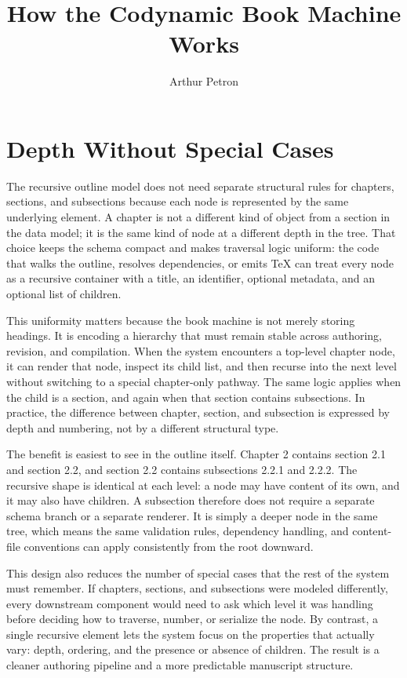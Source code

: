 \documentclass[11pt]{article}
\title{How the Codynamic Book Machine Works}
\author{Arthur Petron}
\begin{document}
\section*{Depth Without Special Cases}

The recursive outline model does not need separate structural rules for chapters, sections, and subsections because each node is represented by the same underlying element. A chapter is not a different kind of object from a section in the data model; it is the same kind of node at a different depth in the tree. That choice keeps the schema compact and makes traversal logic uniform: the code that walks the outline, resolves dependencies, or emits TeX can treat every node as a recursive container with a title, an identifier, optional metadata, and an optional list of children.

This uniformity matters because the book machine is not merely storing headings. It is encoding a hierarchy that must remain stable across authoring, revision, and compilation. When the system encounters a top-level chapter node, it can render that node, inspect its child list, and then recurse into the next level without switching to a special chapter-only pathway. The same logic applies when the child is a section, and again when that section contains subsections. In practice, the difference between chapter, section, and subsection is expressed by depth and numbering, not by a different structural type.

The benefit is easiest to see in the outline itself. Chapter 2 contains section 2.1 and section 2.2, and section 2.2 contains subsections 2.2.1 and 2.2.2. The recursive shape is identical at each level: a node may have content of its own, and it may also have children. A subsection therefore does not require a separate schema branch or a separate renderer. It is simply a deeper node in the same tree, which means the same validation rules, dependency handling, and content-file conventions can apply consistently from the root downward.

This design also reduces the number of special cases that the rest of the system must remember. If chapters, sections, and subsections were modeled differently, every downstream component would need to ask which level it was handling before deciding how to traverse, number, or serialize the node. By contrast, a single recursive element lets the system focus on the properties that actually vary: depth, ordering, and the presence or absence of children. The result is a cleaner authoring pipeline and a more predictable manuscript structure.
\end{document}
